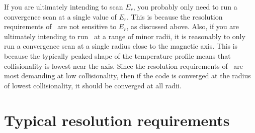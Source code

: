 If you are ultimately intending to scan $E_r$, you probably only need to run a convergence scan
at a single value of $E_r$.  This is because the resolution requirements of \sfincs~are not sensitive to
$E_r$, as discussed above.
Also, if you are ultimately intending to run \sfincs~at a range of minor radii,
it is reasonably to only run a convergence scan at a single radius close to the magnetic axis.
This is because the typically peaked shape of the temperature profile means that
collisionality is lowest near the axis.  Since the resolution requirements of \sfincs~are most
demanding at low collisionality, then if the code is converged at the radius of lowest collisionality,
it should be converged at all radii.

\section{Typical resolution requirements}
